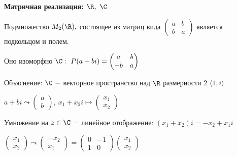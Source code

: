 \begin{example}
\textbf{Матричная реализация: $\R,\ \C$}

\begin{statement}
    Подмножество $M_2(\R),$ состоящее из матриц вида $\begin{pmatrix}
        a & b \\ b & a
    \end{pmatrix}$ является подкольцом и полем.
\end{statement}

Оно изоморфно $\C:\ P(a+bi)=\begin{pmatrix}
    a & b \\ -b & a
\end{pmatrix}$

Объяснение: $\C\ -$ векторное пространство над $\R$ размерности 2 $\langle 
1,i\rangle $

$a+bi\leadsto \begin{pmatrix}
    a \\ b
\end{pmatrix},\ x_1+x_2i\mapsto \begin{pmatrix}
    x_1 \\ x_2
\end{pmatrix}$

Умножение на $z\in \C\ -$ линейное отображение: $(x_1+x_2)i=-x_2+x_1i$

$\begin{pmatrix}
    x_1 \\ x_2
\end{pmatrix}\leadsto \begin{pmatrix}
    -x_2 \\ x_1
\end{pmatrix}=\begin{pmatrix}
    0 & -1 \\ 1 & 0
\end{pmatrix}\begin{pmatrix}
    x_1 \\ x_2
\end{pmatrix}$

\end{example}
